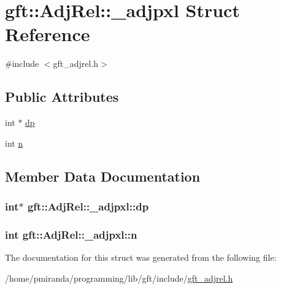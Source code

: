 \hypertarget{structgft_1_1AdjRel_1_1__adjpxl}{}\section{gft\+:\+:Adj\+Rel\+:\+:\+\_\+adjpxl Struct Reference}
\label{structgft_1_1AdjRel_1_1__adjpxl}


{\ttfamily \#include $<$gft\+\_\+adjrel.\+h$>$}

\subsection*{Public Attributes}
\begin{DoxyCompactItemize}
\item 
int $\ast$ \hyperlink{structgft_1_1AdjRel_1_1__adjpxl_af8890c581b85a750929a572d5438a7d6}{dp}
\item 
int \hyperlink{structgft_1_1AdjRel_1_1__adjpxl_affc8455907fd01c6decb1eb324b10a1d}{n}
\end{DoxyCompactItemize}


\subsection{Member Data Documentation}
\subsubsection[{\texorpdfstring{dp}{dp}}]{\setlength{\rightskip}{0pt plus 5cm}int$\ast$ gft\+::\+Adj\+Rel\+::\+\_\+adjpxl\+::dp}\hypertarget{structgft_1_1AdjRel_1_1__adjpxl_af8890c581b85a750929a572d5438a7d6}{}\label{structgft_1_1AdjRel_1_1__adjpxl_af8890c581b85a750929a572d5438a7d6}
\subsubsection[{\texorpdfstring{n}{n}}]{\setlength{\rightskip}{0pt plus 5cm}int gft\+::\+Adj\+Rel\+::\+\_\+adjpxl\+::n}\hypertarget{structgft_1_1AdjRel_1_1__adjpxl_affc8455907fd01c6decb1eb324b10a1d}{}\label{structgft_1_1AdjRel_1_1__adjpxl_affc8455907fd01c6decb1eb324b10a1d}


The documentation for this struct was generated from the following file\+:\begin{DoxyCompactItemize}
\item 
/home/pmiranda/programming/lib/gft/include/\hyperlink{gft__adjrel_8h}{gft\+\_\+adjrel.\+h}\end{DoxyCompactItemize}
